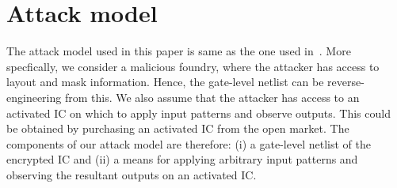 \section{Attack model}
\noindent The attack model used in this paper is same as the one used in~\cite{pramod:host15}. More specfically, we consider a malicious foundry, where the attacker 
has access to layout and mask information. Hence, the gate-level netlist can be reverse-engineering from this. We also assume that the attacker has access to an activated
IC on which to apply input patterns and observe outputs. This could be obtained by purchasing an activated IC from the open
market. The components of our attack model are therefore: (i) a gate-level netlist of the encrypted IC and (ii) a means for applying arbitrary input patterns and observing the resultant
outputs on an activated IC.
